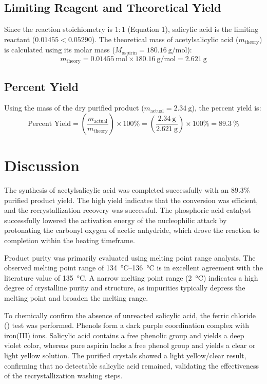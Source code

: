 \documentclass[11pt,a4paper]{article}
\begin{document}
\subsection{Limiting Reagent and Theoretical Yield}
Since the reaction stoichiometry is $1:1$ (Equation 1), salicylic acid is the limiting reactant ($0.01455 < 0.05290$). The theoretical mass of acetylsalicylic acid ($m_{\text{theory}}$) is calculated using its molar mass ($M_{\text{aspirin}} = \qty{180.16}{\gram\per\mole}$):
\begin{equation*}
m_{\text{theory}} = \qty{0.01455}{\mole} \times \qty{180.16}{\gram\per\mole} = \qty{2.621}{\gram}
\end{equation*}

\subsection{Percent Yield}
Using the mass of the dry purified product ($m_{\text{actual}} = \qty{2.34}{\gram}$), the percent yield is:
\begin{equation*}
\text{Percent Yield} = \left( \frac{m_{\text{actual}}}{m_{\text{theory}}} \right) \times 100\% = \left( \frac{\qty{2.34}{\gram}}{\qty{2.621}{\gram}} \right) \times 100\% = \qty{89.3}{\percent}
\end{equation*}

\section{Discussion}
The synthesis of acetylsalicylic acid was completed successfully with an $89.3\%$ purified product yield. The high yield indicates that the conversion was efficient, and the recrystallization recovery was successful. The phosphoric acid catalyst successfully lowered the activation energy of the nucleophilic attack by protonating the carbonyl oxygen of acetic anhydride, which drove the reaction to completion within the heating timeframe.

Product purity was primarily evaluated using melting point range analysis. The observed melting point range of \qtyrange{134}{136}{\degreeCelsius} is in excellent agreement with the literature value of \qty{135}{\degreeCelsius}. A narrow melting point range (\qty{2}{\degreeCelsius}) indicates a high degree of crystalline purity and structure, as impurities typically depress the melting point and broaden the melting range.

To chemically confirm the absence of unreacted salicylic acid, the ferric chloride () test was performed. Phenols form a dark purple coordination complex with iron(III) ions. Salicylic acid contains a free phenolic group and yields a deep violet color, whereas pure aspirin lacks a free phenol group and yields a clear or light yellow solution. The purified crystals showed a light yellow/clear result, confirming that no detectable salicylic acid remained, validating the effectiveness of the recrystallization washing steps.
\end{document}
